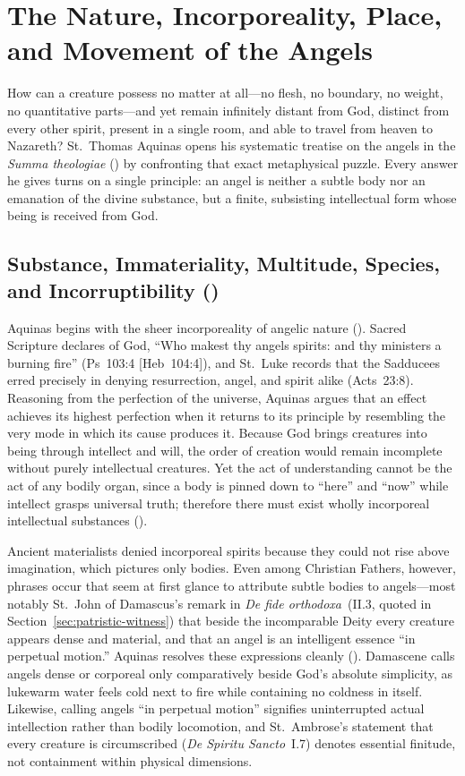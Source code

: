 \section{The Nature, Incorporeality, Place, and Movement of the Angels}\label{sec:st-nature}

How can a creature possess no matter at all---no flesh, no boundary, no weight, no quantitative parts---and yet remain infinitely distant from God, distinct from every other spirit, present in a single room, and able to travel from heaven to Nazareth? St.~Thomas Aquinas opens his systematic treatise on the angels in the \emph{Summa theologiae} () by confronting that exact metaphysical puzzle. Every answer he gives turns on a single principle: an angel is neither a subtle body nor an emanation of the divine substance, but a finite, subsisting intellectual form whose being is received from God.

\subsection{Substance, Immateriality, Multitude, Species, and Incorruptibility ()}

Aquinas begins with the sheer incorporeality of angelic nature (). Sacred Scripture declares of God, ``Who makest thy angels spirits: and thy ministers a burning fire'' (Ps~103:4 [Heb~104:4]), and St.~Luke records that the Sadducees erred precisely in denying resurrection, angel, and spirit alike (Acts~23:8). Reasoning from the perfection of the universe, Aquinas argues that an effect achieves its highest perfection when it returns to its principle by resembling the very mode in which its cause produces it. Because God brings creatures into being through intellect and will, the order of creation would remain incomplete without purely intellectual creatures. Yet the act of understanding cannot be the act of any bodily organ, since a body is pinned down to ``here'' and ``now'' while intellect grasps universal truth; therefore there must exist wholly incorporeal intellectual substances ().

Ancient materialists denied incorporeal spirits because they could not rise above imagination, which pictures only bodies. Even among Christian Fathers, however, phrases occur that seem at first glance to attribute subtle bodies to angels---most notably St.~John of Damascus's remark in \emph{De fide orthodoxa}~(II.3, quoted in Section~\ref{sec:patristic-witness}) that beside the incomparable Deity every creature appears dense and material, and that an angel is an intelligent essence ``in perpetual motion.'' Aquinas resolves these expressions cleanly (). Damascene calls angels dense or corporeal only comparatively beside God's absolute simplicity, as lukewarm water feels cold next to fire while containing no coldness in itself. Likewise, calling angels ``in perpetual motion'' signifies uninterrupted actual intellection rather than bodily locomotion, and St.~Ambrose's statement that every creature is circumscribed (\emph{De Spiritu Sancto}~I.7) denotes essential finitude, not containment within physical dimensions.

